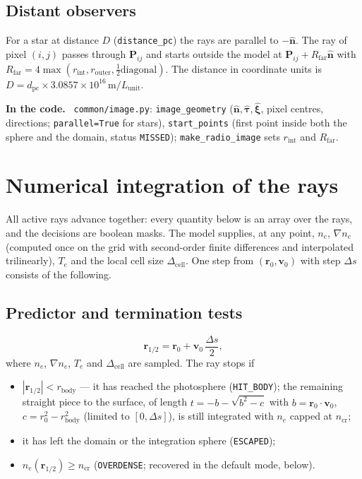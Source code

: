 \documentclass[11pt,a4paper]{article}
\newcommand{\code}[1]{\texttt{#1}}
\newcommand{\vect}[1]{\bm{#1}}
\newcommand{\ncr}{n_\mathrm{cr}}
\newenvironment{incode}{\par\smallskip\noindent\begin{minipage}{\linewidth}\small\color{accent!80!black}\textbf{In the code.}~}{\end{minipage}\par\smallskip}
\begin{document}
\subsection{Distant observers}
For a star at distance $D$ (\code{distance\_pc}) the rays are parallel to $-\hat{\vect n}$. The
ray of pixel $(i,j)$ passes through $\vect P_{ij}$ and starts outside the model at
$\vect P_{ij}+R_\text{far}\hat{\vect n}$ with $R_\text{far}=4\max(r_\text{int},r_\text{outer},
\tfrac12\text{diagonal})$. The distance in coordinate units is
$D=d_\text{pc}\times3.0857\times10^{16}\,\text{m}/L_\text{unit}$.

\begin{incode}
\code{common/image.py}: \code{image\_geometry} ($\hat{\vect n},\hat{\vect\tau},\hat{\vect\xi}$,
pixel centres, directions; \code{parallel=True} for stars), \code{start\_points} (first point inside
both the sphere and the domain, status \code{MISSED}); \code{make\_radio\_image} sets
$r_\text{int}$ and $R_\text{far}$.
\end{incode}

\section{Numerical integration of the rays}\label{sec:step}

All active rays advance together: every quantity below is an array over the rays, and the
decisions are boolean masks. The model supplies, at any point, $n_e$, $\nabla n_e$ (computed once on
the grid with second-order finite differences and interpolated trilinearly), $T_e$ and the local
cell size $\Delta_\text{cell}$. One step from $(\vect r_0,\vect v_0)$ with step $\Delta s$ consists
of the following.

\subsection{Predictor and termination tests}
\begin{equation}
  \vect r_{1/2}=\vect r_0+\vect v_0\,\frac{\Delta s}{2},
\end{equation}
where $n_e$, $\nabla n_e$, $T_e$ and $\Delta_\text{cell}$ are sampled. The ray stops if
\begin{itemize}
  \item $|\vect r_{1/2}|<r_\text{body}$ --- it has reached the photosphere (\code{HIT\_BODY}); the
        remaining straight piece to the surface, of length
        $t=-b-\sqrt{b^2-c}$ with $b=\vect r_0\cdot\vect v_0$, $c=r_0^2-r_\text{body}^2$ (limited to
        $[0,\Delta s]$), is still integrated with $n_e$ capped at $\ncr$;
  \item it has left the domain or the integration sphere (\code{ESCAPED});
  \item $n_e(\vect r_{1/2})\ge\ncr$ (\code{OVERDENSE}; recovered in the default mode, below).
\end{itemize}
\end{document}
